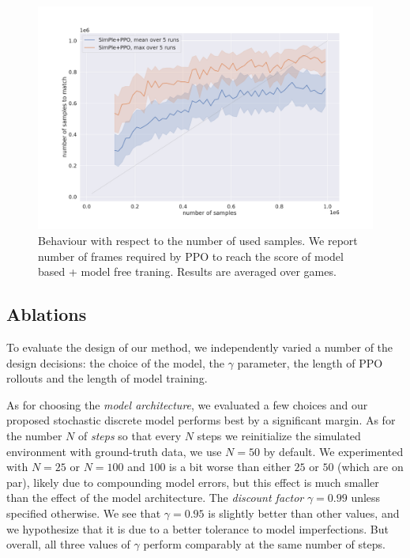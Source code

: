 \begin{figure}
	\includegraphics[width = \mywidth]{figures/number_of_step_simple_ppo.pdf}
	\caption{Behaviour with respect to the number of used samples. We report number of frames required by PPO to reach the score of model based + model free traning. Results are averaged over games.\label{fig:numberOfStepsSimplePPO}}
\end{figure}



\subsection{Ablations}\label{sec:ablations}

To evaluate the design of our method, we independently varied a number of the design decisions: the choice of the model, the $\gamma$ parameter, the length of PPO rollouts and the length of model training.

As for choosing the \emph{model architecture}, we evaluated a few choices and our proposed stochastic discrete model performs best by a significant margin.
As for the number $N$ of \emph{steps} so that every $N$ steps we reinitialize the simulated environment with ground-truth data, we use $N=50$ by default. We experimented with $N=25$ or $N=100$ and $100$ is a bit worse than either $25$ or $50$ (which are on par), likely due to compounding model errors, but this effect is much smaller than the effect of the model architecture. The \emph{discount factor} $\gamma=0.99$ unless specified otherwise.  We see that $\gamma=0.95$ is slightly better than other values, and we hypothesize that it is due to a better tolerance to model imperfections. But overall, all three values of $\gamma$ perform comparably at the same number of steps.


